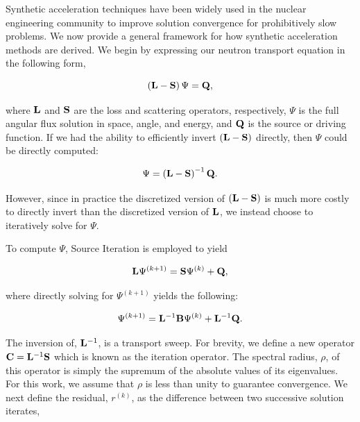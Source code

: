 Synthetic acceleration techniques have been widely used in the nuclear engineering community to improve solution convergence for prohibitively slow problems. We now provide a general framework for how synthetic acceleration methods are derived. We begin by expressing our neutron transport equation in the following form,

\begin{equation}
\label{eq::DSA_simple_trans_eq_w_ops}
\left(  {\bf L} - {\bf S}  \right) \Psi = {\bf Q} ,
\end{equation}

\noindent where ${\bf L}$ and ${\bf S}$ are the loss and scattering operators, respectively, $\Psi$ is the full angular flux solution in space, angle, and energy, and ${\bf Q}$ is the source or driving function. If we had the ability to efficiently invert $\left(  {\bf L} - {\bf S}  \right)$ directly, then $\Psi$ could be directly computed:

\begin{equation}
\label{eq::DSA_simple_trans_eq_w_ops_inverted}
\Psi = \left(  {\bf L} - {\bf S}  \right)^{-1} {\bf Q} .
\end{equation}

\noindent However, since in practice the discretized version of $\left(  {\bf L} - {\bf S}  \right)$ is much more costly to directly invert than the discretized version of ${\bf L}$, we instead choose to iteratively solve for $\Psi$.

To compute $\Psi$, Source Iteration is employed to yield

\begin{equation}
\label{eq::DSA_simple_trans_eq_w_ops_iterates}
 {\bf L} \Psi^{(k+1)} ={\bf S}  \Psi^{(k)} + {\bf Q} ,
\end{equation}

\noindent where directly solving for $\Psi^{(k+1)}$ yields the following:

\begin{equation}
\label{eq::DSA_simple_trans_eq_sol_w_ops_iterates}
 \Psi^{(k+1)} =  {\bf L}^{-1} {\bf B}  \Psi^{(k)} +  {\bf L}^{-1} {\bf Q} .
\end{equation}

\noindent The inversion of, ${\bf L}^{-1}$, is a transport sweep. For brevity, we define a new operator ${\bf C} = {\bf L}^{-1} {\bf S}$ which is known as the iteration operator. The spectral radius, $\rho$, of this operator is simply the supremum of the absolute values of its eigenvalues. For this work, we assume that $\rho$ is less than unity to guarantee convergence. We next define the residual, $r^{(k)}$, as the difference between two successive solution iterates,

